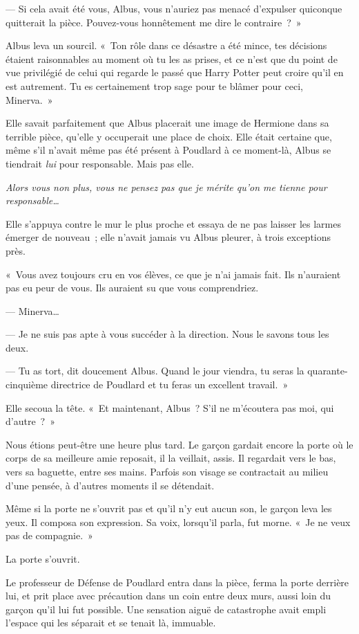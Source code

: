 --- Si cela avait été vous, Albus, vous n'auriez pas menacé d'expulser quiconque quitterait la pièce. Pouvez-vous honnêtement me dire le contraire~?~»

Albus leva un sourcil. «~Ton rôle dans ce désastre a été mince, tes décisions étaient raisonnables au moment où tu les as prises, et ce n'est que du point de vue privilégié de celui qui regarde le passé que Harry Potter peut croire qu'il en est autrement. Tu es certainement trop sage pour te blâmer pour ceci, Minerva.~»

Elle savait parfaitement que Albus placerait une image de Hermione dans sa terrible pièce, qu'elle y occuperait une place de choix. Elle était certaine que, même s'il n'avait même pas été présent à Poudlard à ce moment-là, Albus se tiendrait \emph{lui} pour responsable. Mais pas elle.

\emph{Alors vous non plus, vous ne pensez pas que je mérite qu'on me tienne pour responsable…}

Elle s'appuya contre le mur le plus proche et essaya de ne pas laisser les larmes émerger de nouveau~; elle n'avait jamais vu Albus pleurer, à trois exceptions près.

«~Vous avez toujours cru en vos élèves, ce que je n'ai jamais fait. Ils n'auraient pas eu peur de vous. Ils auraient su que vous comprendriez.

--- Minerva…

--- Je ne suis pas apte à vous succéder à la direction. Nous le savons tous les deux.

--- Tu as tort, dit doucement Albus. Quand le jour viendra, tu seras la quarante-cinquième directrice de Poudlard et tu feras un excellent travail.~»

Elle secoua la tête. «~Et maintenant, Albus~? S'il ne m'écoutera pas moi, qui d'autre~?~»

\later

Nous étions peut-être une heure plus tard. Le garçon gardait encore la porte où le corps de sa meilleure amie reposait, il la veillait, assis. Il regardait vers le bas, vers sa baguette, entre ses mains. Parfois son visage se contractait au milieu d'une pensée, à d'autres moments il se détendait.

Même si la porte ne s'ouvrit pas et qu'il n'y eut aucun son, le garçon leva les yeux. Il composa son expression. Sa voix, lorsqu'il parla, fut morne. «~Je ne veux pas de compagnie.~»

La porte s'ouvrit.

Le professeur de Défense de Poudlard entra dans la pièce, ferma la porte derrière lui, et prit place avec précaution dans un coin entre deux murs, aussi loin du garçon qu'il lui fut possible. Une sensation aiguë de catastrophe avait empli l'espace qui les séparait et se tenait là, immuable.

